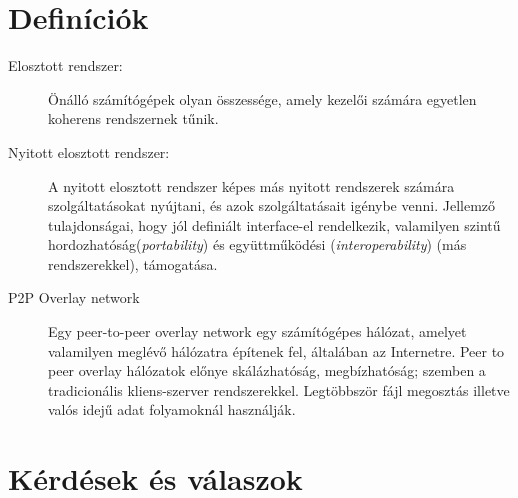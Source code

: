 \documentclass[12pt]{article}
\begin{document}
\section{Definíciók}
\begin{description}
    \item[Elosztott rendszer:] Önálló számítógépek olyan összessége, amely kezelői számára egyetlen koherens rendszernek tűnik.
    \item[Nyitott elosztott rendszer:] A nyitott elosztott rendszer képes más nyitott rendszerek számára szolgáltatásokat nyújtani, és azok szolgáltatásait igénybe venni.  Jellemző tulajdonságai, hogy jól definiált interface-el rendelkezik, valamilyen szintű hordozhatóság(\textit{portability}) és együttműködési (\textit{interoperability}) (más rendszerekkel), támogatása. 
    \item [P2P Overlay network] Egy peer-to-peer overlay network egy számítógépes hálózat, amelyet valamilyen meglévő hálózatra építenek fel, általában az Internetre. Peer to peer overlay hálózatok előnye skálázhatóság, megbízhatóság; szemben a tradicionális kliens-szerver rendszerekkel. Legtöbbször fájl megosztás illetve valós idejű adat folyamoknál használják.
\end{description}
\section{Kérdések és válaszok}
\end{document}

